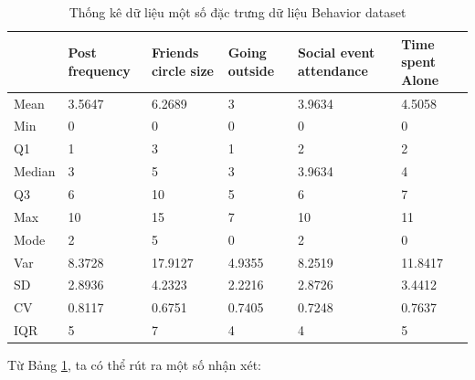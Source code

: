     \begin{table}[htbp]
    \centering
    \caption{ Thống kê dữ liệu một số đặc trưng dữ liệu Behavior dataset}
    \label{tab:stat-behavior}
    \begin{tabular}{|p{2cm}|p{2cm}|p{2cm}|p{2cm}|p{2cm}|p{2cm}|}
        \hline
        & Post frequency & Friends circle size & Going outside & Social event attendance & Time spent Alone \\
        \hline
        Mean & 3.5647 & 6.2689 & 3 & 3.9634 & 4.5058 \\
        \hline
        Min & 0 & 0 & 0 & 0 & 0 \\
        \hline
        Q1 & 1 & 3 & 1 & 2 & 2 \\
        \hline
        Median & 3 & 5 & 3 & 3.9634 & 4 \\
        \hline
        Q3 & 6 & 10 & 5 & 6 & 7 \\
        \hline
        Max & 10 & 15 & 7 & 10 & 11 \\
        \hline
        Mode & 2 & 5 & 0 & 2 & 0 \\
        \hline
        Var & 8.3728 & 17.9127 & 4.9355 & 8.2519 & 11.8417 \\
        \hline
        SD & 2.8936 & 4.2323 & 2.2216 & 2.8726 & 3.4412 \\
        \hline
        CV & 0.8117 & 0.6751 & 0.7405 & 0.7248 & 0.7637 \\
        \hline
        IQR & 5 & 7 & 4 & 4 & 5 \\
        \hline
    \end{tabular}
    \end{table}

    Từ Bảng \ref{tab:stat-behavior}, ta có thể rút ra một số nhận xét:
    

